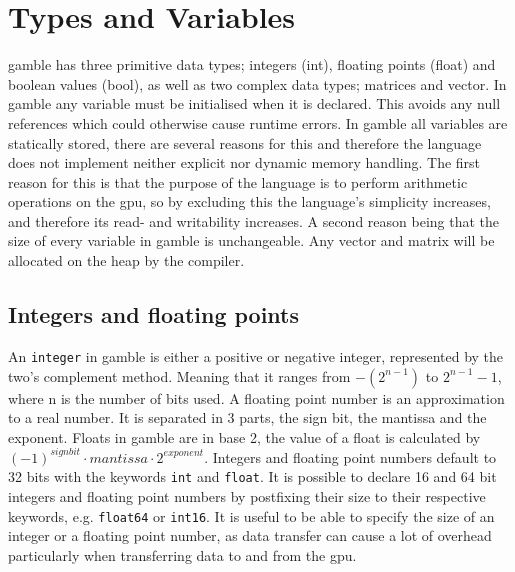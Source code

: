 \section{Types and Variables}\label{sec:Types}
\gls{gamble} has three primitive data types; integers (int), floating points (float) and boolean values (bool), as well as two complex data types; matrices and vector. 
In \gls{gamble} any variable must be initialised when it is declared. 
This avoids any null references which could otherwise cause runtime errors.
In \gls{gamble} all variables are statically stored, there are several reasons for this and therefore the language does not implement neither explicit nor dynamic memory handling. 
The first reason for this is that the purpose of the language is to perform arithmetic operations on the \acrshort{gpu}, so by excluding this the language's simplicity increases, and therefore its read- and writability increases.
A second reason being that the size of every variable in \gls{gamble} is unchangeable.
Any vector and matrix will be allocated on the heap by the compiler. 

\subsection*{Integers and floating points}
An \texttt{integer} in \gls{gamble} is either a positive or negative integer, represented by the two's complement method. 
Meaning that it ranges from $-(2^{n-1}) $ to $2^{n-1} - 1 $, where n is the number of bits used.
A floating point number is an approximation to a real number. 
It is separated in 3 parts, the sign bit, the mantissa and the exponent. 
Floats in \gls{gamble} are in base 2, the value of a float is calculated by $ {(-1)}^{sign bit} \cdot mantissa \cdot 2^{exponent} $. 
Integers and floating point numbers default to 32 bits with the keywords \texttt{int} and \texttt{float}. 
It is possible to declare 16 and 64 bit integers and floating point numbers by postfixing their size to their respective keywords, e.g. \texttt{float64} or \texttt{int16}. 
It is useful to be able to specify the size of an integer or a floating point number, as data transfer can cause a lot of overhead particularly when transferring data to and from the \acrshort{gpu}. 

